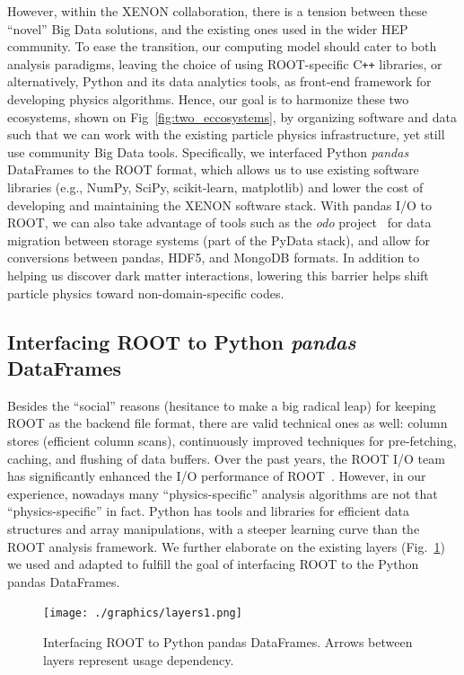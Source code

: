 \documentclass[a4paper]{jpconf}
\begin{document}
However, within the XENON collaboration, there is a tension between these ``novel'' Big Data solutions, and the existing ones used in the wider HEP community.
To ease the transition, our computing model should cater to both analysis paradigms, leaving the choice of using ROOT-specific C\texttt{++} libraries, or alternatively, 
Python and its data analytics tools, as front-end framework for developing physics algorithms. 
Hence, our goal is to harmonize these two ecosystems, shown on Fig~\ref{fig:two_eccosystems}, by organizing software and data
such that we can work with the existing particle physics infrastructure, yet still use community Big Data tools.
Specifically, we interfaced Python \textit{pandas} DataFrames to the ROOT format, which allows us to use 
existing software libraries (e.g., NumPy, SciPy, scikit-learn, matplotlib) and lower the cost of developing and maintaining the XENON software stack. 
With pandas I/O to ROOT, we
can also take advantage of tools such as the \textit{odo} project~\cite{odo-pydata} for data migration between storage systems (part of the PyData stack), and allow for conversions between
pandas, HDF5, and MongoDB formats. 
In addition to helping us discover dark matter interactions, lowering this barrier helps shift particle physics
toward non-domain-specific codes.


\subsection{Interfacing ROOT to Python \textit{pandas} DataFrames}
Besides the ``social'' reasons (hesitance to make a big radical leap) for keeping ROOT as the backend file format, 
there are valid technical ones as well: column stores (efficient column scans), continuously improved techniques for pre-fetching, caching, and flushing of data buffers.
Over the past years, the ROOT I/O team has significantly enhanced the I/O performance of ROOT~\cite{1742-6596-331-4-042005}.
However, in our experience, nowadays many ``physics-specific'' analysis algorithms are not that ``physics-specific'' in fact. 
Python has tools and libraries for efficient data structures and array manipulations, with a steeper learning curve than the ROOT analysis framework.
We further elaborate on the existing layers (Fig.~\ref{fig:rootpy_layers}) we used and adapted to fulfill the goal of interfacing ROOT to the Python pandas DataFrames.


\begin{figure}[!t]
\centering
\begin{center}
\texttt{[image: ./graphics/layers1.png]}
\caption{Interfacing ROOT to Python pandas DataFrames. Arrows between layers represent usage dependency.}
\label{fig:rootpy_layers}
\end{center}
\end{figure}
\end{document}
